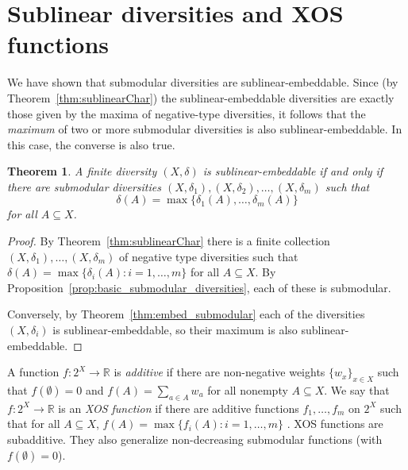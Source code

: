 \documentclass{article}
\theoremstyle{plain}
\newtheorem{theorem}{Theorem}
\theoremstyle{definition}
\renewcommand{\Re}{\mathbb{R}}
\begin{document}
\section{Sublinear diversities and XOS functions}

We have shown that submodular diversities are sublinear-embeddable. Since (by Theorem~\ref{thm:sublinearChar}) the sublinear-embeddable diversities are exactly those given by the maxima of negative-type diversities, it follows that the {\em maximum} of two or more submodular diversities is also sublinear-embeddable. In this case, the converse is also true.

\begin{theorem} \label{thm:max_submod}
A finite diversity $(X,\delta)$ is sublinear-embeddable if and only if there are submodular diversities $(X,\delta_1),(X,\delta_2),\ldots,(X,\delta_m)$ such that 
\[\delta(A) = \max\{\delta_1(A),\ldots,\delta_m(A)\}\]
for all $A \subseteq X$. 
\end{theorem}
\begin{proof}
By Theorem~\ref{thm:sublinearChar} there is a finite collection $(X,\delta_1),\ldots,(X,\delta_m)$ of negative type diversities such that $\delta(A) = \max\{\delta_i(A):i=1,\ldots,m\}$ for all $A \subseteq X$. By Proposition~\ref{prop:basic_submodular_diversities}, each of these is submodular. 

Conversely, by Theorem~\ref{thm:embed_submodular} each of the diversities $(X,\delta_i)$ is sublinear-embeddable, so their maximum is also sublinear-embeddable.
\end{proof}

A function $f:2^X \rightarrow \Re$ is {\em additive} if there are non-negative weights $\{w_x\}_{x \in X}$ such that $f(\emptyset) = 0$ and $f(A) = \sum_{a \in A} w_a$ for all nonempty $A \subseteq X$. We say that $f:2^X \rightarrow \Re$ is an {\em XOS function} if there are additive functions $f_1,\ldots,f_m$ on $2^X$ such that for all $A \subseteq X$, $f(A) = \max\{f_i(A):i=1,\ldots,m\}$ \cite{nisan2000bidding}. XOS functions are subadditive. They also generalize non-decreasing submodular functions (with $f(\emptyset) = 0$). 
\end{document}

